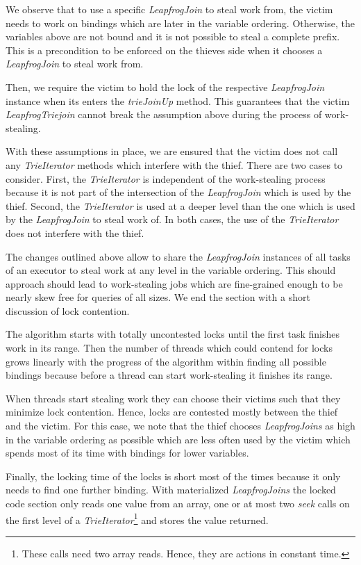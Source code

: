We observe that to use a specific \textit{LeapfrogJoin} to steal work from, the
victim needs to work on bindings which are later in the variable ordering.
Otherwise, the variables above are not bound and it is not possible to steal a complete prefix.
This is a precondition to be enforced on the thieves side when it chooses a \textit{LeapfrogJoin}
to steal work from.

Then, we require the victim to hold the lock of the respective \textit{LeapfrogJoin}
instance when its enters the \textit{trieJoinUp} method.
This guarantees that the victim \textit{LeapfrogTriejoin} cannot break the assumption above during the process
of work-stealing.

With these assumptions in place, we are ensured that the victim does not call
any \textit{TrieIterator} methods which interfere with the thief.
There are two cases to consider.
First, the \textit{TrieIterator} is independent of the work-stealing process because it is not
part of the intersection of the \textit{LeapfrogJoin} which is used by the thief.
Second, the \textit{TrieIterator} is used at a deeper level than the one which is used by the
\textit{LeapfrogJoin} to steal work of.
In both cases, the use of the \textit{TrieIterator} does not interfere with the thief.

The changes outlined above allow to share the \textit{LeapfrogJoin} instances of all
tasks of an executor to steal work at any level in the variable ordering.
This should approach should lead to work-stealing jobs which are fine-grained enough
to be nearly skew free for queries of all sizes.
We end the section with a short discussion of lock contention.

The algorithm starts with totally uncontested locks until the first task finishes work in its
range.
Then the number of threads which could contend for locks grows linearly with the progress of the
algorithm within finding all possible bindings because before a thread can start work-stealing it
finishes its range.

When threads start stealing work they can choose their victims such that they minimize lock contention.
Hence, locks are contested mostly between the thief and the victim.
For this case, we note that the thief chooses \textit{LeapfrogJoins} as high in the variable ordering
as possible which are less often used by the victim which spends most of its time with bindings
for lower variables.

Finally, the locking time of the locks is short most of the times because it only needs to find
one further binding.
With materialized \textit{LeapfrogJoins} the locked code section only
reads one value from an array, one or at most two \textit{seek} calls on the first level of a
\textit{TrieIterator}\footnote{These calls need two array reads. Hence, they are actions in constant time.} and stores the value returned.

